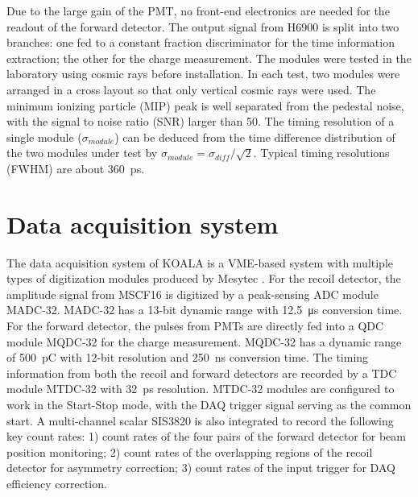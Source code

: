 \documentclass[number,5p]{elsarticle}
\begin{document}
Due to the large gain of the PMT, no front-end electronics are needed for the readout of the forward detector.
The output signal from H6900 is split into two branches: one fed to a
constant fraction discriminator for the time information extraction; the other
for the charge measurement.
The modules were tested in the laboratory using cosmic rays before installation.
In each test, two modules were arranged in a cross layout so that only vertical
cosmic rays were used.
The minimum ionizing particle (MIP) peak is well separated from the pedestal
noise, with the signal to noise ratio (SNR) larger than 50.
The timing resolution of a single module ($\sigma_{module}$) can be deduced from the time difference distribution of the two modules under test by $\sigma_{module}=\sigma_{diff}/\sqrt{2}$.
Typical timing resolutions (FWHM) are about \SI{360}{\pico\second}.

\section{Data acquisition system}
\label{sec:daq}

The data acquisition system of KOALA is a VME-based system with multiple types
of digitization modules produced by Mesytec \cite{mesytec}.
For the recoil detector, the amplitude signal from MSCF16 is digitized by a
peak-sensing ADC module MADC-32.
MADC-32 has a 13-bit dynamic range with \SI{12.5}{\micro\second} conversion time.
For the forward detector, the pulses from PMTs are directly fed into a QDC
module MQDC-32 for the charge measurement.
MQDC-32 has a dynamic range of \SI{500}{\pico\coulomb} with 12-bit resolution
and \SI{250}{\nano\second} conversion time.
The timing information from both the recoil and forward detectors are recorded
by a TDC module MTDC-32 with \SI{32}{\pico\second} resolution.
MTDC-32 modules are configured to work in the Start-Stop mode, with the DAQ
trigger signal serving as the common start.
A multi-channel scalar SIS3820 \cite{sis} is also integrated to record
the following key count rates: 1) count rates of the four pairs of the forward detector for beam position monitoring; 2) count rates of the overlapping regions of the recoil detector for asymmetry correction; 3) count rates of the input trigger for DAQ efficiency correction.
\end{document}
